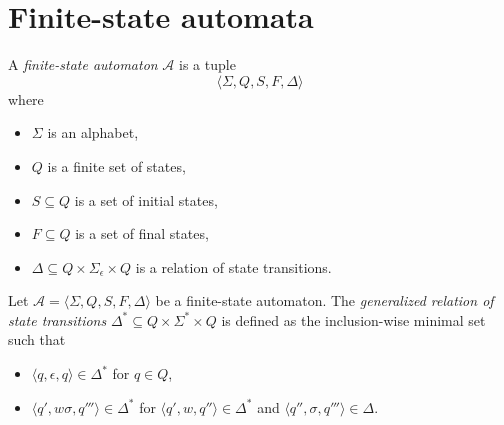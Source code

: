 \section{Finite-state automata}

\begin{definition}
  A \emph{finite-state automaton} $\mathcal{A}$ is a tuple
  \begin{equation*}
    \langle \Sigma, Q, S, F, \Delta \rangle
  \end{equation*}
  where
  \begin{itemize}
    \item $\Sigma$ is an alphabet,
    \item $Q$ is a finite set of states,
    \item $S \subseteq Q$ is a set of initial states,
    \item $F \subseteq Q$ is a set of final states,
    \item $\Delta \subseteq Q \times \Sigma_\epsilon \times Q$ is a relation of state
	    transitions.
  \end{itemize}
\end{definition}

\begin{definition}
  Let $\mathcal{A} = \langle \Sigma, Q, S, F, \Delta \rangle$ be a finite-state
  automaton. The \emph{generalized relation of state transitions} $\Delta^*
  \subseteq Q \times \Sigma^* \times Q$ is defined as the inclusion-wise minimal set
  such that
  \begin{itemize}
    \item $\langle q, \epsilon, q \rangle \in \Delta^*$ for $q \in Q$,
    \item $\langle q', w\sigma, q''' \rangle \in \Delta^*$ for $\langle q', w, q''
	    \rangle \in \Delta^*$ and $\langle q'', \sigma, q''' \rangle \in \Delta$.
  \end{itemize}
\end{definition}

